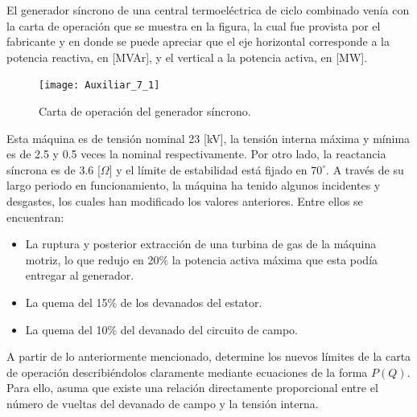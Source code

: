 \documentclass[
  11pt,
  letterpaper,
   addpoints,
   answers
  ]{exam}
\begin{document}
\begin{questions}
    \question El generador síncrono de una central termoeléctrica de ciclo combinado venía con la carta de operación que se muestra en la figura, la cual fue provista por el fabricante y en donde se puede apreciar que el eje horizontal corresponde a la potencia reactiva, en [MVAr], y el vertical a la potencia activa, en [MW].

    \begin{figure}[h!]
        \centering
        \texttt{[image: Auxiliar\_7\_1]} %
        \caption{Carta de operación del generador síncrono.}
    \end{figure}
    Esta máquina es de tensión nominal 23 [kV], la tensión interna máxima y mínima es de 2.5 y 0.5 veces la nominal respectivamente. Por otro lado, la reactancia síncrona es de 3.6 [\(\Omega\)] y el límite de estabilidad está fijado en $70^{\circ}$. A través de su largo periodo en funcionamiento, la máquina ha tenido algunos incidentes y desgastes, los cuales han modificado los valores anteriores. Entre ellos se encuentran:
    \begin{itemize}
        \item La ruptura y posterior extracción de una turbina de gas de la máquina motriz, lo que redujo en 20\% la potencia activa máxima que esta podía entregar al generador.
        \item La quema del 15\% de los devanados del estator.
        \item La quema del 10\% del devanado del circuito de campo.
    \end{itemize}
    A partir de lo anteriormente mencionado, determine los nuevos límites de la carta de operación describiéndolos claramente mediante ecuaciones de la forma \( P(Q) \). Para ello, asuma que existe una relación directamente proporcional entre el número de vueltas del devanado de campo y la tensión interna.
    
    
    
    \begin{solution}

\end{solution}
\end{questions}
\end{document}
